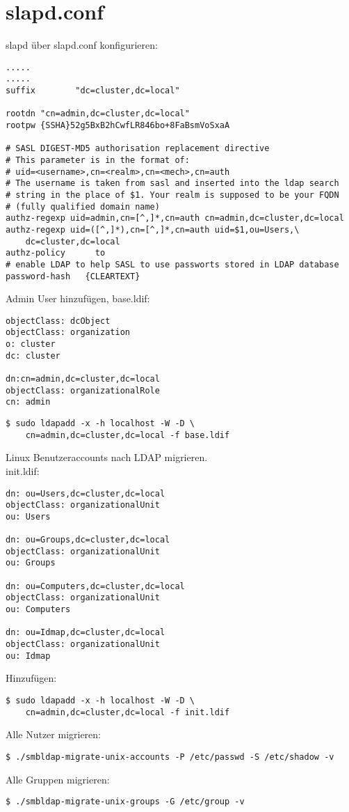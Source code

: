 \section{slapd.conf}
slapd über slapd.conf konfigurieren:
\begin{lstlisting}[style=Bash]
.....
.....
suffix        "dc=cluster,dc=local"

rootdn "cn=admin,dc=cluster,dc=local"
rootpw {SSHA}52g5BxB2hCwfLR846bo+8FaBsmVoSxaA

# SASL DIGEST-MD5 authorisation replacement directive
# This parameter is in the format of:
# uid=<username>,cn=<realm>,cn=<mech>,cn=auth
# The username is taken from sasl and inserted into the ldap search 
# string in the place of $1. Your realm is supposed to be your FQDN 
# (fully qualified domain name)
authz-regexp uid=admin,cn=[^,]*,cn=auth cn=admin,dc=cluster,dc=local
authz-regexp uid=([^,]*),cn=[^,]*,cn=auth uid=$1,ou=Users,\
	dc=cluster,dc=local
authz-policy      to
# enable LDAP to help SASL to use passworts stored in LDAP database
password-hash   {CLEARTEXT}
\end{lstlisting}
Admin User hinzufügen, base.ldif:
\begin{lstlisting}[style=Bash]
objectClass: dcObject
objectClass: organization
o: cluster
dc: cluster

dn:cn=admin,dc=cluster,dc=local
objectClass: organizationalRole
cn: admin
\end{lstlisting}
\begin{lstlisting}[style=Bash]
$ sudo ldapadd -x -h localhost -W -D \
	cn=admin,dc=cluster,dc=local -f base.ldif 
\end{lstlisting}
Linux Benutzeraccounts nach LDAP migrieren.\\
init.ldif:
\begin{lstlisting}[style=Bash]
dn: ou=Users,dc=cluster,dc=local
objectClass: organizationalUnit
ou: Users

dn: ou=Groups,dc=cluster,dc=local
objectClass: organizationalUnit
ou: Groups

dn: ou=Computers,dc=cluster,dc=local
objectClass: organizationalUnit
ou: Computers

dn: ou=Idmap,dc=cluster,dc=local
objectClass: organizationalUnit
ou: Idmap
\end{lstlisting}
Hinzufügen:
\begin{lstlisting}[style=Bash]
$ sudo ldapadd -x -h localhost -W -D \
	cn=admin,dc=cluster,dc=local -f init.ldif
\end{lstlisting}
Alle Nutzer migrieren:
\begin{lstlisting}[style=Bash]
$ ./smbldap-migrate-unix-accounts -P /etc/passwd -S /etc/shadow -v
\end{lstlisting}
Alle Gruppen migrieren:
\begin{lstlisting}[style=Bash]
$ ./smbldap-migrate-unix-groups -G /etc/group -v 
\end{lstlisting}
